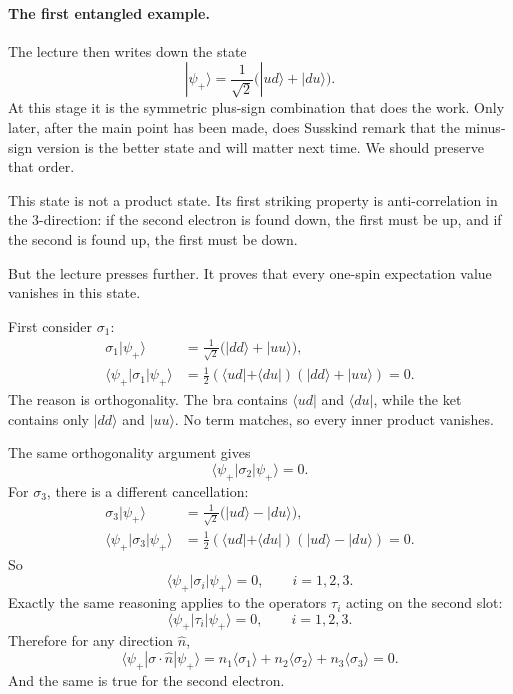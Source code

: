 \paragraph{The first entangled example.} The lecture then writes down the state
\begin{equation}
|\psi_+\rangle
=
\frac{1}{\sqrt2}\bigl(|ud\rangle+|du\rangle\bigr).
\end{equation}
At this stage it is the symmetric plus-sign combination that does the work. Only later, after the main point has been made, does Susskind remark that the minus-sign version is the better state and will matter next time. We should preserve that order.

This state is not a product state. Its first striking property is anti-correlation in the \(3\)-direction: if the second electron is found down, the first must be up, and if the second is found up, the first must be down.

But the lecture presses further. It proves that every one-spin expectation value vanishes in this state.

First consider \(\sigma_1\):
\begin{align}
\sigma_1|\psi_+\rangle
&=
\frac{1}{\sqrt2}\bigl(|dd\rangle+|uu\rangle\bigr), \\
\langle \psi_+|\sigma_1|\psi_+\rangle
&=
\frac{1}{2}
(\langle ud|+\langle du|)(|dd\rangle+|uu\rangle)
=0.
\end{align}
The reason is orthogonality. The bra contains \(\langle ud|\) and \(\langle du|\), while the ket contains only \(|dd\rangle\) and \(|uu\rangle\). No term matches, so every inner product vanishes.

The same orthogonality argument gives
\begin{equation}
\langle \psi_+|\sigma_2|\psi_+\rangle=0.
\end{equation}
For \(\sigma_3\), there is a different cancellation:
\begin{align}
\sigma_3|\psi_+\rangle
&=
\frac{1}{\sqrt2}\bigl(|ud\rangle-|du\rangle\bigr), \\
\langle \psi_+|\sigma_3|\psi_+\rangle
&=
\frac{1}{2}
(\langle ud|+\langle du|)(|ud\rangle-|du\rangle)
=0.
\end{align}
So
\begin{equation}
\langle \psi_+|\sigma_i|\psi_+\rangle=0,
\qquad
i=1,2,3.
\end{equation}
Exactly the same reasoning applies to the operators \(\tau_i\) acting on the second slot:
\begin{equation}
\langle \psi_+|\tau_i|\psi_+\rangle=0,
\qquad
i=1,2,3.
\end{equation}
Therefore for any direction \(\hat n\),
\begin{equation}
\langle \psi_+|\sigma\cdot\hat n|\psi_+\rangle
=
n_1\langle \sigma_1\rangle
+
n_2\langle \sigma_2\rangle
+
n_3\langle \sigma_3\rangle
=
0.
\end{equation}
And the same is true for the second electron.


